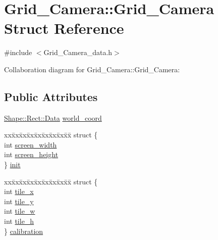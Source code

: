 \hypertarget{struct_grid___camera_1_1_grid___camera}{}\section{Grid\+\_\+\+Camera\+:\+:Grid\+\_\+\+Camera Struct Reference}
\label{struct_grid___camera_1_1_grid___camera}


{\ttfamily \#include $<$Grid\+\_\+\+Camera\+\_\+data.\+h$>$}



Collaboration diagram for Grid\+\_\+\+Camera\+:\+:Grid\+\_\+\+Camera\+:
\subsection*{Public Attributes}
\begin{DoxyCompactItemize}
\item 
\mbox{\hyperlink{struct_shape_1_1_rect_1_1_data}{Shape\+::\+Rect\+::\+Data}} \mbox{\hyperlink{struct_grid___camera_1_1_grid___camera_ad636f6577347fdc95abe118612593bdc}{world\+\_\+coord}}
\item 
\begin{tabbing}
xx\=xx\=xx\=xx\=xx\=xx\=xx\=xx\=xx\=\kill
struct \{\\
\>int \mbox{\hyperlink{struct_grid___camera_1_1_grid___camera_a1db5641f523429ab4ec0885d3a3e773d}{screen\_width}}\\
\>int \mbox{\hyperlink{struct_grid___camera_1_1_grid___camera_a6d428cca878eff55dba5f6ea12228559}{screen\_height}}\\
\} \mbox{\hyperlink{struct_grid___camera_1_1_grid___camera_aec0dcb893c9e4070b24a95081c6602b5}{init}}\\

\end{tabbing}\item 
\begin{tabbing}
xx\=xx\=xx\=xx\=xx\=xx\=xx\=xx\=xx\=\kill
struct \{\\
\>int \mbox{\hyperlink{struct_grid___camera_1_1_grid___camera_ac555c3fabbd1d65b4d6e2f3d4d514b68}{tile\_x}}\\
\>int \mbox{\hyperlink{struct_grid___camera_1_1_grid___camera_a57288e0b21ef2de01a9ddce92042514d}{tile\_y}}\\
\>int \mbox{\hyperlink{struct_grid___camera_1_1_grid___camera_ad97d4b92f37e6d73a22e2bc2a2ec7961}{tile\_w}}\\
\>int \mbox{\hyperlink{struct_grid___camera_1_1_grid___camera_a43d891949821e61b2f993b6a45780b9b}{tile\_h}}\\
\} \mbox{\hyperlink{struct_grid___camera_1_1_grid___camera_a750e40265ae0287e599636d79097ae45}{calibration}}\\

\end{tabbing}\end{DoxyCompactItemize}


